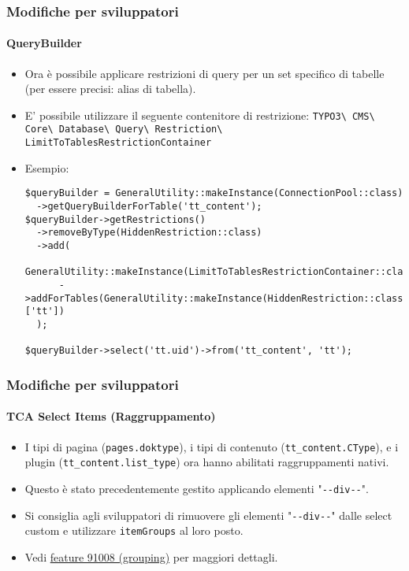 \begin{frame}[fragile]
	\frametitle{Modifiche per sviluppatori}
	\framesubtitle{QueryBuilder}

	\lstset{basicstyle=\tiny\ttfamily}

	\begin{itemize}
		\item Ora è possibile applicare restrizioni di query per un set specifico di tabelle
		    (per essere precisi: alias di tabella).
		\item E' possibile utilizzare il seguente contenitore di restrizione:\newline
			\begingroup
				\fontsize{7}{9}
					\texttt{TYPO3\textbackslash
						CMS\textbackslash
						Core\textbackslash
						Database\textbackslash
						Query\textbackslash
						Restriction\textbackslash
						LimitToTablesRestrictionContainer}
			\endgroup

		\item Esempio:
\begin{lstlisting}
$queryBuilder = GeneralUtility::makeInstance(ConnectionPool::class)
  ->getQueryBuilderForTable('tt_content');
$queryBuilder->getRestrictions()
  ->removeByType(HiddenRestriction::class)
  ->add(
    GeneralUtility::makeInstance(LimitToTablesRestrictionContainer::class)
      ->addForTables(GeneralUtility::makeInstance(HiddenRestriction::class), ['tt'])
  );

$queryBuilder->select('tt.uid')->from('tt_content', 'tt');
\end{lstlisting}

	\end{itemize}

\end{frame}


\begin{frame}[fragile]
	\frametitle{Modifiche per sviluppatori}
	\framesubtitle{TCA Select Items (Raggruppamento)}

	\begin{itemize}
		\item I tipi di pagina (\texttt{pages.doktype}), i tipi di contenuto (\texttt{tt\_content.CType}),
			e i plugin (\texttt{tt\_content.list\_type}) ora hanno abilitati raggruppamenti nativi.
		\item Questo è stato precedentemente gestito applicando elementi
			"\texttt{-}\texttt{-div-}\texttt{-}".
		\item Si consiglia agli sviluppatori di rimuovere gli elementi
			"\texttt{-}\texttt{-div-}\texttt{-}"
			dalle select custom e utilizzare \texttt{itemGroups} al loro posto.
		\item Vedi
			\href{https://docs.typo3.org/c/typo3/cms-core/master/en-us/Changelog/10.4/Feature-91008-ItemGroupingForTCASelectItems.html}{feature 91008 (grouping)}
			per maggiori dettagli.
	\end{itemize}

\end{frame}

